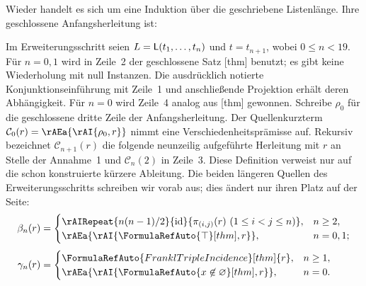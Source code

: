Wieder handelt es sich um eine Induktion über die geschriebene
Listenlänge. Ihre geschlossene Anfangsherleitung ist:
\begin{tabproofwide}
\end{tabproofwide}
Im Erweiterungsschritt seien \(L=\mathsf L(t_1,\ldots,t_n)\)
und \(t=t_{n+1}\), wobei \(0\leq n<19\).
Für \(n=0,1\) wird in Zeile~2 der geschlossene Satz
\FormulaRefAuto{\top}[thm] benutzt; es gibt keine Wiederholung mit
null Instanzen. Die ausdrücklich notierte Konjunktionseinführung mit
Zeile~1 und anschließende Projektion erhält deren Abhängigkeit.
Für \(n=0\) wird Zeile~4 analog aus
[thm] gewonnen.
Schreibe \(\rho_0\) für die geschlossene dritte Zeile der
Anfangsherleitung. Der Quellenkurzterm
\(\mathcal C_0(r)=\rAEa{\rAI{\rho_0,r}}\) nimmt eine
Verschiedenheitsprämisse auf. Rekursiv bezeichnet
\(\mathcal C_{n+1}(r)\) die folgende neunzeilig aufgeführte
Herleitung mit \(r\) an Stelle der Annahme~1 und
\(\mathcal C_n(2)\) in Zeile~3. Diese Definition verweist nur auf
die schon konstruierte kürzere Ableitung.
Die beiden längeren Quellen des Erweiterungsschritts schreiben wir
vorab aus; dies ändert nur ihren Platz auf der Seite:
\[
\begin{aligned}
 \beta_n(r)&=
 \begin{cases}
   \rAIRepeat{n(n-1)/2}{\operatorname{id}}
     {\pi_{(i,j)}(r)\ (1\leq i<j\leq n)},&n\geq2,\\
   \rAEa{\rAI{\FormulaRefAuto{\top}[thm],r}},&n=0,1;
 \end{cases}\\[3pt]
 \gamma_n(r)&=
 \begin{cases}
   \FormulaRefAuto{FranklTripleIncidence}[thm]{r},&n\geq1,\\
   \rAEa{\rAI{\FormulaRefAuto{x\not\in\varnothing}[thm],r}},&n=0.
 \end{cases}
\end{aligned}
\]
